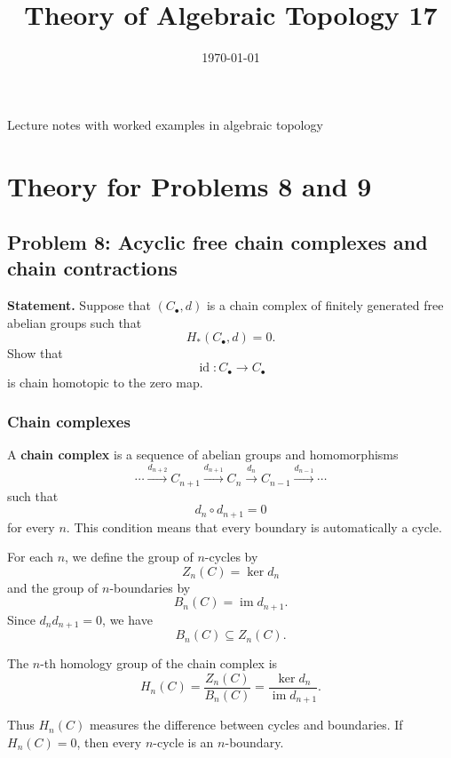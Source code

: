\documentclass[12pt,a4paper]{article}
\title{\vspace{-1.5em}\bfseries Theory of Algebraic Topology 17}
\author{}
\date{\today}
\theoremstyle{notespace}
\begin{document}
	\maketitle
	\thispagestyle{plain}
		\begin{center}
		\begin{minipage}{0.92\textwidth}
			Lecture notes with worked examples in algebraic topology
		\end{minipage}
	\end{center}
		\tableofcontents
	\clearpage


\section{Theory for Problems 8 and 9}

\subsection{Problem 8: Acyclic free chain complexes and chain contractions}

\textbf{Statement.}
Suppose that \((C_\bullet,d)\) is a chain complex of finitely generated free abelian groups such that
\[
H_*(C_\bullet,d)=0.
\]
Show that
\[
\operatorname{id}\colon C_\bullet\to C_\bullet
\]
is chain homotopic to the zero map.

\subsubsection{Chain complexes}

A \textbf{chain complex} is a sequence of abelian groups and homomorphisms
\[
\cdots \xrightarrow{d_{n+2}} C_{n+1}
\xrightarrow{d_{n+1}} C_n
\xrightarrow{d_n} C_{n-1}
\xrightarrow{d_{n-1}} \cdots
\]
such that
\[
d_n\circ d_{n+1}=0
\]
for every \(n\). This condition means that every boundary is automatically a cycle.

For each \(n\), we define the group of \(n\)-cycles by
\[
Z_n(C)=\ker d_n
\]
and the group of \(n\)-boundaries by
\[
B_n(C)=\operatorname{im} d_{n+1}.
\]
Since \(d_n d_{n+1}=0\), we have
\[
B_n(C)\subseteq Z_n(C).
\]

The \(n\)-th homology group of the chain complex is
\[
H_n(C)=\frac{Z_n(C)}{B_n(C)}
=
\frac{\ker d_n}{\operatorname{im} d_{n+1}}.
\]

Thus \(H_n(C)\) measures the difference between cycles and boundaries. If \(H_n(C)=0\), then every \(n\)-cycle is an \(n\)-boundary.
\end{document}
